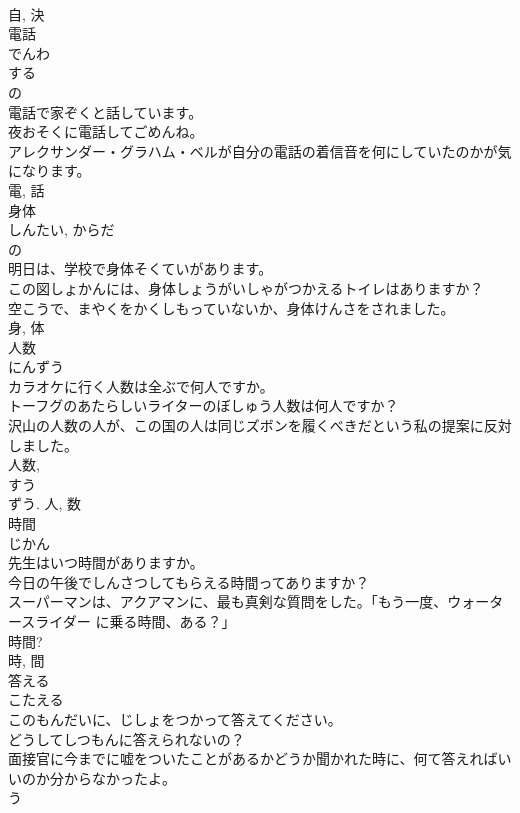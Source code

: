 \documentclass[8pt]{extreport}
\begin{document}
\begin{CJK}{UTF8}{min}
\\	自, 決	
\\	電話	
\\	でんわ	
\\	する 
\\	の 
\\	電話で家ぞくと話しています。	
\\	夜おそくに電話してごめんね。	
\\	アレクサンダー・グラハム・ベルが自分の電話の着信音を何にしていたのかが気になります。	
\\	電, 話	
\\	身体	
\\	しんたい, からだ	
\\	の 
\\	明日は、学校で身体そくていがあります。	
\\	この図しょかんには、身体しょうがいしゃがつかえるトイレはありますか？	
\\	空こうで、まやくをかくしもっていないか、身体けんさをされました。	
\\	身, 体	
\\	人数	
\\	にんずう	
\\	カラオケに行く人数は全ぶで何人ですか。	
\\	トーフグのあたらしいライターのぼしゅう人数は何人ですか？	
\\	沢山の人数の人が、この国の人は同じズボンを履くべきだという私の提案に反対しました。	
\\	人数, 
\\	すう 
\\	ずう.	人, 数	
\\	時間	
\\	じかん	
\\	先生はいつ時間がありますか。	
\\	今日の午後でしんさつしてもらえる時間ってありますか？	
\\	スーパーマンは、アクアマンに、最も真剣な質問をした。「もう一度、ウォータースライダー に乗る時間、ある？」	
\\	時間?	
\\	時, 間	
\\	答える	
\\	こたえる	
\\	このもんだいに、じしょをつかって答えてください。	
\\	どうしてしつもんに答えられないの？	
\\	面接官に今までに嘘をついたことがあるかどうか聞かれた時に、何て答えればいいのか分からなかったよ。	
\\	う 

\end{CJK}
\end{document}
